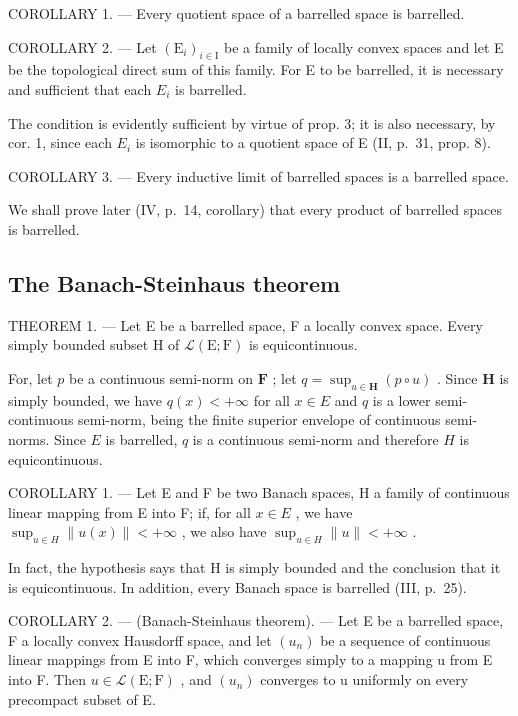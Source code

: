 COROLLARY 1. --- Every quotient space of a barrelled space is barrelled.

COROLLARY 2. --- Let \((\mathrm{E}_{i})_{i\in\mathrm{I}}\) be a family of locally convex spaces and let E be the topological direct sum of this family. For E to be barrelled, it is necessary and sufficient that each \(E_{i}\) is barrelled.

The condition is evidently sufficient by virtue of prop. 3; it is also necessary, by cor. 1, since each \(E_{i}\) is isomorphic to a quotient space of E (II, p.~31, prop. 8).

COROLLARY 3. --- Every inductive limit of barrelled spaces is a barrelled space.

We shall prove later (IV, p.~14, corollary) that every product of barrelled spaces is barrelled.

\subsection{The Banach-Steinhaus theorem}

THEOREM 1. --- Let E be a barrelled space, F a locally convex space. Every simply bounded subset H of \(\mathcal{L}(\mathrm{E};\mathrm{F})\) is equicontinuous.

For, let \(p\) be a continuous semi-norm on \(\mathbf{F}\) ; let \(q = \sup_{u\in \mathbf{H}}(p\circ u)\) . Since \(\mathbf{H}\) is simply bounded, we have \(q(x) < +\infty\) for all \(x \in E\) and \(q\) is a lower semi-continuous semi-norm, being the finite superior envelope of continuous semi-norms. Since \(E\) is barrelled, \(q\) is a continuous semi-norm and therefore \(H\) is equicontinuous.

COROLLARY 1. --- Let E and F be two Banach spaces, H a family of continuous linear mapping from E into F; if, for all \(x \in E\) , we have \(\sup_{u \in H} \|u(x)\| < +\infty\) , we also have \(\sup_{u \in H} \|u\| < +\infty\) .

In fact, the hypothesis says that H is simply bounded and the conclusion that it is equicontinuous. In addition, every Banach space is barrelled (III, p.~25).

COROLLARY 2. --- (Banach-Steinhaus theorem). --- Let E be a barrelled space, F a locally convex Hausdorff space, and let \((u_n)\) be a sequence of continuous linear mappings from E into F, which converges simply to a mapping u from E into F. Then \(u \in \mathcal{L}(\mathrm{E}; \mathrm{F})\) , and \((u_{n})\) converges to u uniformly on every precompact subset of E.

